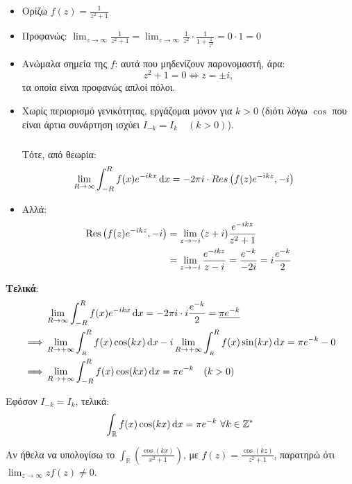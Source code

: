 \documentclass[12pt,a4paper,notitlepage,fleqn]{article}
\begin{document}
    \begin{itemize}
    	\item Ορίζω \( \displaystyle f(z) = \frac{1}{z^2+1} \)
    	\item Προφανώς: \( 
    	\displaystyle
    	\lim_{z\to \infty} \frac{1}{z^2+1} = \lim_{z\to \infty}\frac{1}{z^2}
    	\cdot \frac{1}{1+\frac{1}{z^2}} = 0\cdot 1 = 0
    	 \)
    	\item Ανώμαλα σημεία της \( f \): αυτά που μηδενίζουν παρονομαστή, άρα:
    	\[
    	z^2+1 = 0 \iff \boxed{z = \pm i},
    	\]
    	τα οποία είναι προφανώς απλοί πόλοι.
    	\item Χωρίς περιορισμό γενικότητας, εργάζομαι μόνον για \( k>0 \) (διότι λόγω
    	\( \cos \) που είναι άρτια συνάρτηση ισχύει \( I_{-k} = I_k \quad (k>0) \)).
    	
    	\subparagraph{}
    	Τότε, από θεωρία:
    	\begin{align*}
    	\lim_{R\to \infty} \int_{-R}^{R} f(x) e^{-ikx} \mathop{}\!\mathrm{d} x &=
    	-2\pi i \cdot Res\left(
    	f(z)e^{-ikz}
    	, -i \right)
    	\end{align*}
    	
    	\item Αλλά:
    	\begin{align*}
    	\operatorname{Res} \left(
    	f(z)e^{-ikz},-i
    	\right) &= \lim_{z\to -i} (z+i)\frac{e^{-ikz}}{z^2+1}
    	\\ &= \lim_{z\to -i} \frac{e^{-ikz}}{z-i} = \frac{e^{-k}}{-2i} = i\frac{e^{-k}}{2}
    	 \end{align*}
    \end{itemize}
    
    \textbf{Τελικά}:
    \begin{align*}
    & \lim_{R\to \infty} \int_{-R}^{R} f(x)e^{-ikx} \mathop{}\!\mathrm{d} x = -2\pi i\cdot i\frac{e^{-k}}{2}
    = \underline{\pi e^{-k}}
    \\ \implies & \lim_{R\to + \infty} \int_{_R}^{R} f(x) \cos(kx)\mathop{}\!\mathrm{d} x
    - i \lim_{R\to +\infty} \int_{_R}^{R} f(x)\sin(kx)\mathop{}\!\mathrm{d} x
    = \pi e^{-k} - 0
    \\ \implies & \lim_{R\to +\infty} \int_{-R}^{R} f(x)\cos(kx)\mathop{}\!\mathrm{d} x = \pi e^{-k}
    \quad (k > 0)
    \end{align*}

    Εφόσον \( I_{-k} = I_k \), τελικά:
    \[
    \int_{\mathbb{R}} f(x)\cos(kx)\mathop{}\!\mathrm{d} x = \pi e^{-k} \ \forall k\in\mathbb{Z}^*
    \]
    
    Αν ήθελα να υπολογίσω το \( \int_{\mathbb R} \left(\frac{\cos(kx)}{x^2+1}\right) \), με
    \( f(z) = \frac{\cos(kz)}{z^2+1} \), παρατηρώ ότι \( \displaystyle \lim_{z\to \infty}
    zf(z) \neq 0
     \).
     
\end{document}
